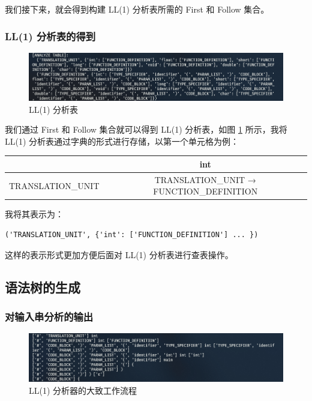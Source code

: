 \documentclass[UTF8]{ctexart}
\begin{document}
我们接下来，就会得到构建 LL(1) 分析表所需的 First 和 Follow 集合。

\subsubsection{LL(1) 分析表的得到}
\begin{figure}[H]
  \includegraphics[width=\linewidth]{images/ll1_table.png}
  \caption{LL(1) 分析表}
  \label{fig:figure5}
\end{figure}

我们通过 First 和 Follow 集合就可以得到 LL(1) 分析表，如图 \ref{fig:figure5} 所示，我将 LL(1) 分析表通过字典的形式进行存储，以第一个单元格为例：

\begin{table}[H]
  \begin{tabular}{c|c}
  \hline
                    & int                                      \\ \hline
  TRANSLATION\_UNIT & TRANSLATION\_UNIT → FUNCTION\_DEFINITION \\ \hline
  \end{tabular}
\end{table}

我将其表示为：

\begin{verbatim}
('TRANSLATION_UNIT', {'int': ['FUNCTION_DEFINITION'] ... })
\end{verbatim}

这样的表示形式更加方便后面对 LL(1) 分析表进行查表操作。

\subsection{语法树的生成}
\subsubsection{对输入串分析的输出}
\begin{figure}[h]
  \includegraphics[width=\linewidth]{images/parse.png}
  \caption{LL(1) 分析器的大致工作流程}
  \label{fig:figure6}
\end{figure}
\end{document}
